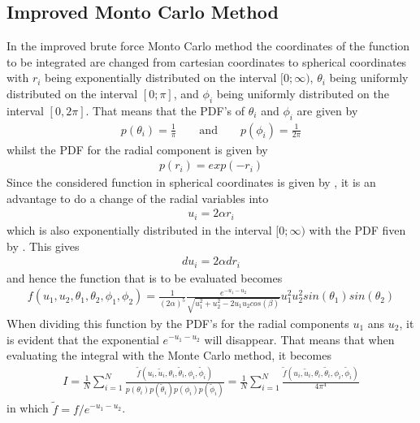 \subsection{Improved Monto Carlo Method}
\label{subsec:ImprovedMCMethod}
In the improved brute force Monto Carlo method the coordinates of the function to be integrated are changed from cartesian coordinates to spherical coordinates with $r_i$ being exponentially distributed on the interval $[0;\infty)$, $\theta_i$ being uniformly distributed on the interval $[0;\pi]$, and $\phi_i$ being uniformly distributed on the interval $[0,2\pi]$. 
That means that the PDF's of $\theta_i$ and $\phi_i$ are given by
\begin{align}
	p(\theta_i ) = \frac{1}{\pi} \qquad \text{and} \qquad p(\phi_i) = \frac{1}{2\pi}
	\label{sec:ImprovedMCMethod1}
\end{align} 
whilst the PDF for the radial component is given by
\begin{align}
	p(r_i) = exp(-r_i )
	\label{sec:ImprovedMCMethod2}
\end{align}
Since the considered function in spherical coordinates is given by ,
it is an advantage to do a change of the radial variables into
\begin{align}
	u_i = 2\alpha r_i
\end{align}  
which is also exponentially distributed in the interval $[0;\infty)$ with the PDF fiven by .
This gives
\begin{align}
	du_i = 2\alpha dr_i
\end{align}
and hence the function that is to be evaluated becomes
\begin{align}  
   f(u_1, u_2, \theta_1, \theta_2, \phi_1, \phi_2 ) = 
   \frac{1}{(2\alpha)^5}
   \frac{e^{-u_1 - u_2 }}{\sqrt{u_1^2 + u_2 ^2 -2 u_1 u_2 cos(\beta)}}  
u_1 ^2 u_2 ^2 sin(\theta_1 ) sin(\theta_2 )    
   \label{eq:ImprovedMCMethod4}
\end{align}
When dividing this function by the PDF's for the radial components $u_1$ ans $u_2$, it is evident that the exponential $e^{-u_1 - u_2 }$ will disappear.
That means that when evaluating the integral with the Monte Carlo method, it becomes
\begin{align}
	I = \frac{1}{N} \sum_{i=1} ^N \frac{\tilde{f} (u_i, \tilde{u}_i, \theta_i, \tilde{\theta}_i, \phi_i, \tilde{\phi}_i )}{p(\theta_i)p(\tilde{\theta}_i) p(\phi_i) p(\tilde{\phi}_i)} 
	= \frac{1}{N} \sum_{i=1} ^N \frac{\tilde{f} (u_i, \tilde{u}_i, \theta_i, \tilde{\theta}_i, \phi_i, \tilde{\phi}_i )}{4\pi ^4}
\end{align}
in which $\tilde{f} = f/e^{-u_1 - u_2 }$.

